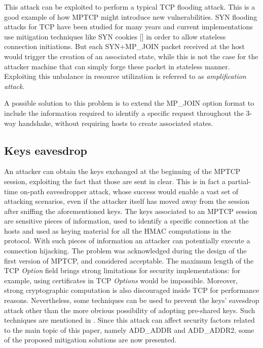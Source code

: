 This attack can be exploited to perform a typical TCP flooding attack. This is a good example of how MPTCP might introduce new vulnerabilities. 
SYN flooding attacks for TCP have been studied for many years and current implementations use mitigation techniques like SYN cookies [] in order to allow stateless connection initiations. But each SYN+MP\_JOIN packet received at the host would trigger the creation of an associated state, while this is not the case for the attacker machine that can simply forge these packet in stateless manner. Exploiting this unbalance in resource utilization is referred to as \textit{amplification attack}.

A possible solution to this problem is to extend the MP\_JOIN option format to include the information required to identify a specific request throughout the 3-way handshake, without requiring hosts to create associated states.

\subsection{Keys eavesdrop}
An attacker can obtain the keys exchanged at the beginning of the MPTCP session, exploiting the fact that those are sent in clear. This is in fact a partial-time on-path eavesdropper attack, whose success would enable a vast set of attacking scenarios, even if the attacker itself has moved away from the session after sniffing the aforementioned keys.
The keys associated to an MPTCP session are sensitive pieces of information, used to identify a specific connection at the hosts and used as keying material for all the HMAC computations in the protocol. With such pieces of information an attacker can potentially execute a connection hijacking.  The problem was acknowledged during the design of the first version of MPTCP, and considered acceptable. The maximum length of the TCP \textit{Option} field brings strong limitations for security implementations: for example, using certificates in TCP \textit{Options} would be impossible. Moreover, strong cryptographic computation is also discouraged inside TCP for performance reasons. Nevertheless, some techniques can be used to prevent the keys' eavesdrop attack other than the more obvious possibility of adopting pre-shared keys. Such techniques are mentioned in . Since this attack can affect security factors related to the main topic of this paper, namely ADD\_ADDR and ADD\_ADDR2, some of the proposed mitigation solutions are now presented.


